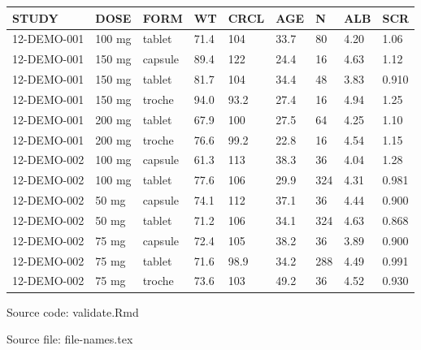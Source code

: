 {\def\arraystretch{1.4}\tabcolsep=5pt
\begin{threeparttable}
\begin{tabular}[h]{lllllllll}
\hline
STUDY & DOSE & FORM & WT & CRCL & AGE & N & ALB & SCR \\
\hline
12-DEMO-001 & 100 mg & tablet & 71.4 & 104 & 33.7 & 80 & 4.20 & 1.06 \\
12-DEMO-001 & 150 mg & capsule & 89.4 & 122 & 24.4 & 16 & 4.63 & 1.12 \\
12-DEMO-001 & 150 mg & tablet & 81.7 & 104 & 34.4 & 48 & 3.83 & 0.910 \\
12-DEMO-001 & 150 mg & troche & 94.0 & 93.2 & 27.4 & 16 & 4.94 & 1.25 \\
12-DEMO-001 & 200 mg & tablet & 67.9 & 100 & 27.5 & 64 & 4.25 & 1.10 \\
12-DEMO-001 & 200 mg & troche & 76.6 & 99.2 & 22.8 & 16 & 4.54 & 1.15 \\
12-DEMO-002 & 100 mg & capsule & 61.3 & 113 & 38.3 & 36 & 4.04 & 1.28 \\
12-DEMO-002 & 100 mg & tablet & 77.6 & 106 & 29.9 & 324 & 4.31 & 0.981 \\
12-DEMO-002 & 50 mg & capsule & 74.1 & 112 & 37.1 & 36 & 4.44 & 0.900 \\
12-DEMO-002 & 50 mg & tablet & 71.2 & 106 & 34.1 & 324 & 4.63 & 0.868 \\
12-DEMO-002 & 75 mg & capsule & 72.4 & 105 & 38.2 & 36 & 3.89 & 0.900 \\
12-DEMO-002 & 75 mg & tablet & 71.6 & 98.9 & 34.2 & 288 & 4.49 & 0.991 \\
12-DEMO-002 & 75 mg & troche & 73.6 & 103 & 49.2 & 36 & 4.52 & 0.930 \\
\hline
\end{tabular}
\begin{tablenotes}[flushleft]
\item Source code: validate.Rmd
\item Source file: file-names.tex
\end{tablenotes}
\end{threeparttable}
}
